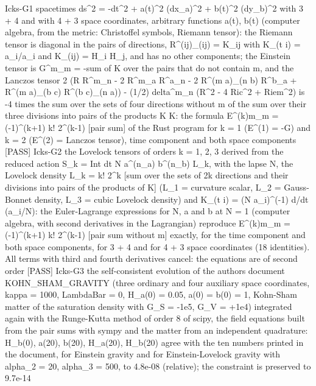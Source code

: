 \documentclass[
  10pt,
]{article}
\newenvironment{Shaded}{}{}
\newcommand{\NormalTok}[1]{#1}
\begin{document}
\begin{Shaded}
\begin{Highlighting}[]
\NormalTok{[PASS] Icks{-}G1  spacetimes ds\^{}2 = {-}dt\^{}2 + a(t)\^{}2 (dx\_a)\^{}2 + b(t)\^{}2 (dy\_b)\^{}2 with 3 + 4 and with 4 + 3 space coordinates, arbitrary functions a(t), b(t) (computer algebra, from the metric: Christoffel symbols, Riemann tensor): the Riemann tensor is diagonal in the pairs of directions, R\^{}(ij)\_(ij) = K\_ij with K\_(t i) = a\_i\textquotesingle{}\textquotesingle{}/a\_i and K\_(ij) = H\_i H\_j, and has no other components; the Einstein tensor is G\^{}m\_m = {-}sum of K over the pairs that do not contain m, and the Lanczos tensor 2 (R R\^{}m\_n {-} 2 R\^{}m\_a R\^{}a\_n {-} 2 R\^{}(m a)\_(n b) R\^{}b\_a + R\^{}(m a)\_(b c) R\^{}(b c)\_(n a)) {-} (1/2) delta\^{}m\_n (R\^{}2 {-} 4 Ric\^{}2 + Riem\^{}2) is {-}4 times the sum over the sets of four directions without m of the sum over their three divisions into pairs of the products K K: the formula E\^{}(k)m\_m = ({-}1)\^{}(k+1) k! 2\^{}(k{-}1) [pair sum] of the Rust program for k = 1 (E\^{}(1) = {-}G) and k = 2 (E\^{}(2) = Lanczos tensor), time component and both space components}
\NormalTok{[PASS] Icks{-}G2  the Lovelock tensors of orders k = 1, 2, 3 derived from the reduced action S\_k = Int dt N a\^{}(n\_a) b\^{}(n\_b) L\_k, with the lapse N, the Lovelock density L\_k = k! 2\^{}k [sum over the sets of 2k directions and their divisions into pairs of the products of K] (L\_1 = curvature scalar, L\_2 = Gauss{-}Bonnet density, L\_3 = cubic Lovelock density) and K\_(t i) = (N a\_i)\^{}({-}1) d/dt (a\_i\textquotesingle{}/N): the Euler{-}Lagrange expressions for N, a and b at N = 1 (computer algebra, with second derivatives in the Lagrangian) reproduce E\^{}(k)m\_m = ({-}1)\^{}(k+1) k! 2\^{}(k{-}1) [pair sum without m] exactly, for the time component and both space components, for 3 + 4 and for 4 + 3 space coordinates (18 identities). All terms with third and fourth derivatives cancel: the equations are of second order}
\NormalTok{[PASS] Icks{-}G3  the self{-}consistent evolution of the author\textquotesingle{}s document KOHN\_SHAM\_GRAVITY (three ordinary and four auxiliary space coordinates, kappa = 1000, LambdaBar = 0, H\_a(0) = 0.05, a(0) = b(0) = 1, Kohn{-}Sham matter of the saturation density with G\_S = {-}1e5, G\_V = +1e4) integrated again with the Runge{-}Kutta method of order 8 of scipy, the field equations built from the pair sums with sympy and the matter from an independent quadrature: H\_b(0), a(20), b(20), H\_a(20), H\_b(20) agree with the ten numbers printed in the document, for Einstein gravity and for Einstein{-}Lovelock gravity with alpha\_2 = 20, alpha\_3 = 500, to 4.8e{-}08 (relative); the constraint is preserved to 9.7e{-}14}

\end{Highlighting}
\end{Shaded}
\end{document}
